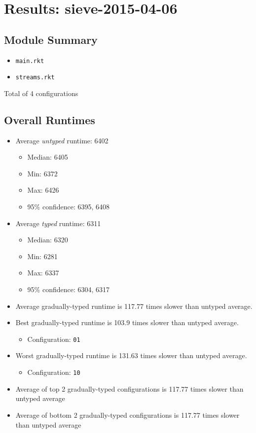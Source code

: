 \documentclass{article}
\newcommand{\mono}[1]{\texttt{#1}}
\begin{document}
\section{Results: sieve-2015-04-06}

\subsection{Module Summary}
\begin{itemize}
\item \mono{main.rkt}
\item \mono{streams.rkt}\end{itemize}
Total of 4 configurations

\subsection{Overall Runtimes}
\begin{itemize}
\item Average \emph{untyped} runtime: 6402
  \begin{itemize}
  \item Median: 6405
  \item Min: 6372
  \item Max: 6426
  \item 95\% confidence: 6395, 6408
  \end{itemize}
\item Average \emph{typed} runtime: 6311
  \begin{itemize}
  \item Median: 6320
  \item Min: 6281
  \item Max: 6337
  \item 95\% confidence: 6304, 6317
  \end{itemize}
\item Average gradually-typed runtime is 117.77 times slower than untyped average.
\item Best gradually-typed runtime is 103.9 times slower than untyped average.
\begin{itemize}\item Configuration: \mono{01}\end{itemize}
\item Worst gradually-typed runtime is 131.63 times slower than untyped average.
\begin{itemize}\item Configuration: \mono{10}\end{itemize}
\item Average of top 2 gradually-typed configurations is 117.77 times slower than untyped average
\item Average of bottom 2 gradually-typed configurations is 117.77 times slower than untyped average
\end{itemize}
\end{document}
